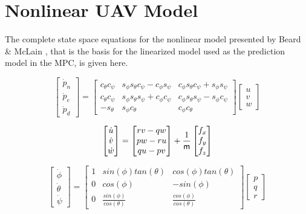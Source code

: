 \chapter{Nonlinear UAV Model}
\label{ch:nonlinear_model}

The complete state space equations for the nonlinear model presented by Beard \& McLain \cite{uavBEARD}, that is the basis for the linearized model used as the prediction model in the MPC, is given here.

\begin{equation}
	\begin{bmatrix}
	\dot{p}_n \\ \dot{p}_e \\ \dot{p}_d
	\end{bmatrix}
	= 
	\begin{bmatrix}
		c_\theta c_\psi & s_\phi s_\theta c_\psi - c_\phi s_\psi & c_\phi s_\theta c_\psi + s_\phi s_\psi \\
		c_\theta c_\psi & s_\phi s_\theta s_\psi + c_\phi c_\psi & c_\phi s_\theta s_\psi - s_\phi c_\psi \\
		-s_\theta & s_\phi c_\theta & c_\phi c_\theta
	\end{bmatrix}
	\begin{bmatrix}
		u \\ v \\ w
	\end{bmatrix}
\end{equation}

\begin{equation}
\label{eq:vel_dot}
	\begin{bmatrix}
		\dot{u} \\ \dot{v} \\ \dot{w}
	\end{bmatrix}
	=
	\begin{bmatrix}
		rv-qw \\ pw-ru \\ qu-pv
	\end{bmatrix}
	+ \frac{1}{\text{\sffamily m\/}}
	\begin{bmatrix}
		f_x \\ f_y \\ f_z
	\end{bmatrix}
\end{equation}

\begin{equation}
	\begin{bmatrix}
		\dot{\phi} \\ \dot{\theta} \\ \dot{\psi}
	\end{bmatrix}
	=
	\begin{bmatrix}
		1 & sin(\phi)tan(\theta) & cos(\phi)tan(\theta) \\
		0 & cos(\phi) & -sin(\phi) \\
		0 & \frac{sin(\phi)}{cos(\theta)} & \frac{cos(\phi)}{cos(\theta)}
	\end{bmatrix}
	\begin{bmatrix}
		p \\ q \\ r
	\end{bmatrix}
\end{equation}

